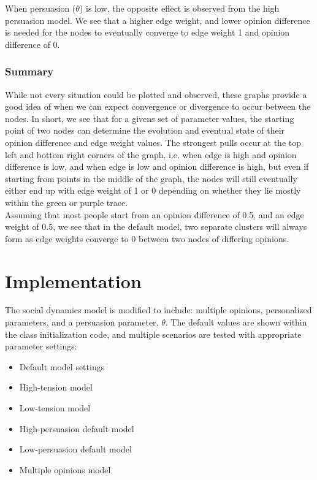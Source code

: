 \documentclass[11pt]{article}
\providecommand{\tightlist}{%
      \setlength{\itemsep}{0pt}\setlength{\parskip}{0pt}}
\begin{document}
When persuasion (\(\theta\)) is low, the opposite effect is observed
from the high persuasion model. We see that a higher edge weight, and
lower opinion difference is needed for the nodes to eventually converge
to edge weight 1 and opinion difference of 0.

 \subsubsection*{Summary}

While not every situation could be plotted and observed, these graphs
provide a good idea of when we can expect convergence or divergence to
occur between the nodes. In short, we see that for a givens set of
parameter values, the starting point of two nodes can determine the
evolution and eventual state of their opinion difference and edge weight
values. The strongest pulls occur at the top left and bottom right
corners of the graph, i.e. when edge is high and opinion difference is
low, and when edge is low and opinion difference is high, but even if
starting from points in the middle of the graph, the nodes will still
eventually either end up with edge weight of 1 or 0 depending on whether
they lie mostly within the green or purple trace.\\

Assuming that most people start from an opinion difference of 0.5, and
an edge weight of 0.5, we see that in the default model, two separate
clusters will always form as edge weights converge to 0 between two
nodes of differing opinions.

\newpage
\section{Implementation}

The social dynamics model is modified to include: multiple opinions,
personalized parameters, and a persuasion parameter, \(\theta\). The
default values are shown within the class initialization code, and
multiple scenarios are tested with appropriate parameter settings:

\begin{itemize}
\tightlist
\item
  Default model settings
\item
  High-tension model
\item
  Low-tension model
\item
  High-persuasion default model
\item
  Low-persuasion default model
\item
  Multiple opinions model
\end{itemize}
\end{document}
